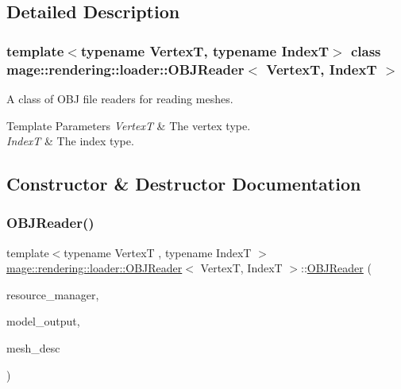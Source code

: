 \subsection{Detailed Description}
\subsubsection*{template$<$typename VertexT, typename IndexT$>$\newline
class mage\+::rendering\+::loader\+::\+O\+B\+J\+Reader$<$ Vertex\+T, Index\+T $>$}

A class of O\+BJ file readers for reading meshes.


\begin{DoxyTemplParams}{Template Parameters}
{\em VertexT} & The vertex type. \\
\hline
{\em IndexT} & The index type. \\
\hline
\end{DoxyTemplParams}


\subsection{Constructor \& Destructor Documentation}
\mbox{\label{classmage_1_1rendering_1_1loader_1_1_o_b_j_reader_a5fe68a545e05c266b69f35e4dc9027a9}} 
\subsubsection{\texorpdfstring{O\+B\+J\+Reader()}{OBJReader()}\hspace{0.1cm}{\footnotesize\ttfamily [1/3]}}
{\footnotesize\ttfamily template$<$typename VertexT , typename IndexT $>$ \\
\mbox{\hyperlink{classmage_1_1rendering_1_1loader_1_1_o_b_j_reader}{mage\+::rendering\+::loader\+::\+O\+B\+J\+Reader}}$<$ VertexT, IndexT $>$\+::\mbox{\hyperlink{classmage_1_1rendering_1_1loader_1_1_o_b_j_reader}{O\+B\+J\+Reader}} (\begin{DoxyParamCaption}\item[{\mbox{\hyperlink{classmage_1_1rendering_1_1_resource_manager}{Resource\+Manager}} \&}]{resource\+\_\+manager,  }\item[{\mbox{\hyperlink{structmage_1_1rendering_1_1_model_output}{Model\+Output}}$<$ VertexT, IndexT $>$ \&}]{model\+\_\+output,  }\item[{const \mbox{\hyperlink{classmage_1_1rendering_1_1_mesh_descriptor}{Mesh\+Descriptor}}$<$ VertexT, IndexT $>$ \&}]{mesh\+\_\+desc }\end{DoxyParamCaption})\hspace{0.3cm}{\ttfamily [explicit]}}


